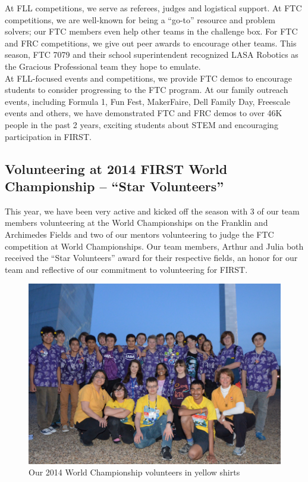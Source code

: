 At FLL competitions, we serve as referees, judges and logistical support. At FTC competitions, we are well-known for being a “go-to” resource and problem solvers; our FTC members even help other teams in the challenge box. For FTC and FRC competitions, we give out peer awards to encourage other teams. This season, FTC 7079 and their school superintendent recognized LASA Robotics as the Gracious Professional team they hope to emulate.\\
 
At FLL-focused events and competitions, we provide FTC demos to encourage students to consider progressing to the FTC program. At our family outreach events, including Formula 1, Fun Fest, MakerFaire, Dell Family Day, Freescale events and others, we have demonstrated  FTC and FRC demos to over 46K people in the past 2 years, exciting students about STEM and encouraging participation in FIRST.\\

\subsection{Volunteering at 2014 FIRST World Championship – “Star Volunteers”}
This year, we have been very active and kicked off the season with 3 of our team members volunteering at the World Championships on the Franklin and Archimedes Fields and two of our mentors volunteering to judge the FTC competition at World Championships. Our team members, Arthur and Julia both received the “Star Volunteers” award for their respective fields, an honor for our team and reflective of our commitment to volunteering for FIRST.
\begin{figure}[H]
	\centering
	\includegraphics[width=\linewidth]{volunteers}
	\caption[]{Our 2014 World Championship volunteers in yellow shirts}
	\label{fig:volunteers}
\end{figure}

